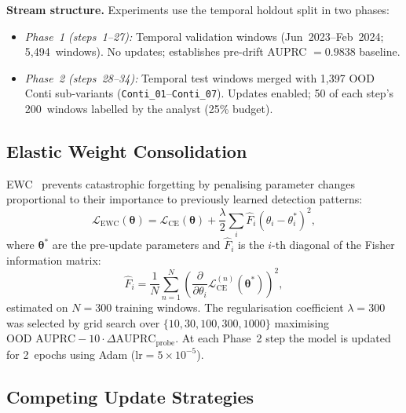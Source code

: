 \documentclass[journal]{IEEEtran}
\begin{document}
\textbf{Stream structure.}
Experiments use the temporal holdout split in two phases:
\begin{itemize}
\item \emph{Phase~1 (steps~1--27):} Temporal validation windows (Jun~2023--Feb~2024;
  5,494~windows). No updates; establishes pre-drift AUPRC $= 0.9838$ baseline.
\item \emph{Phase~2 (steps~28--34):} Temporal test windows merged with 1,397 OOD Conti
  sub-variants (\texttt{Conti\_01}--\texttt{Conti\_07}).
  Updates enabled; 50 of each step's 200~windows labelled by the analyst (25\% budget).
\end{itemize}

\subsection{Elastic Weight Consolidation}
\label{subsec:ewc}

EWC~\cite{kirkpatrick_ewc_2017} prevents catastrophic forgetting by penalising parameter
changes proportional to their importance to previously learned detection patterns:
\begin{equation}
\mathcal{L}_{\mathrm{EWC}}(\boldsymbol{\theta}) =
\mathcal{L}_{\mathrm{CE}}(\boldsymbol{\theta})
+ \frac{\lambda}{2}\sum_i \hat{F}_i \left(\theta_i - \theta_i^*\right)^2,
\label{eq:ewc}
\end{equation}
where $\boldsymbol{\theta}^*$ are the pre-update parameters and
$\hat{F}_i$ is the $i$-th diagonal of the Fisher information matrix:
\begin{equation}
\hat{F}_i = \frac{1}{N}\sum_{n=1}^{N}
    \left(\frac{\partial}{\partial\theta_i}
    \mathcal{L}_{\mathrm{CE}}^{(n)}(\boldsymbol{\theta}^*)\right)^{\!2},
\label{eq:fisher}
\end{equation}
estimated on $N=300$ training windows.
The regularisation coefficient $\lambda=300$ was selected by grid search over
$\{10,30,100,300,1000\}$ maximising $\text{OOD AUPRC} - 10\cdot\Delta\text{AUPRC}_{\mathrm{probe}}$.
At each Phase~2 step the model is updated for 2~epochs using
Adam ($\mathrm{lr}=5\!\times\!10^{-5}$).

\subsection{Competing Update Strategies}
\label{subsec:update_strategies}
\end{document}
